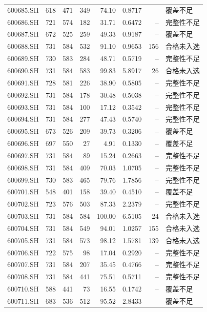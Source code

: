 \documentclass[10pt,a4paper]{article}
\begin{document}
\begin{longtable}{lrrr r r r l}
600685.SH & 618 & 471 & 349 & 74.10 & 0.8717 & -- & 覆盖不足\\
600686.SH & 721 & 574 & 182 & 31.71 & 0.6472 & -- & 完整性不足\\
600687.SH & 672 & 525 & 259 & 49.33 & 0.9187 & -- & 覆盖不足\\
600688.SH & 731 & 584 & 532 & 91.10 & 0.9653 & 156 & 合格未入选\\
600689.SH & 730 & 583 & 284 & 48.71 & 0.5719 & -- & 完整性不足\\
600690.SH & 731 & 584 & 583 & 99.83 & 5.8917 & 26 & 合格未入选\\
600691.SH & 728 & 581 & 226 & 38.90 & 0.5805 & -- & 完整性不足\\
600692.SH & 731 & 584 & 178 & 30.48 & 0.5038 & -- & 完整性不足\\
600693.SH & 731 & 584 & 100 & 17.12 & 0.3542 & -- & 完整性不足\\
600694.SH & 731 & 584 & 277 & 47.43 & 0.5740 & -- & 完整性不足\\
600695.SH & 673 & 526 & 209 & 39.73 & 0.3206 & -- & 覆盖不足\\
600696.SH & 697 & 550 & 27 & 4.91 & 0.1330 & -- & 覆盖不足\\
600697.SH & 731 & 584 & 89 & 15.24 & 0.2663 & -- & 完整性不足\\
600698.SH & 731 & 584 & 409 & 70.03 & 1.0705 & -- & 完整性不足\\
600699.SH & 730 & 583 & 465 & 79.76 & 1.7856 & -- & 完整性不足\\
600701.SH & 548 & 401 & 158 & 39.40 & 0.4510 & -- & 覆盖不足\\
600702.SH & 723 & 576 & 503 & 87.33 & 2.2379 & -- & 完整性不足\\
600703.SH & 731 & 584 & 584 & 100.00 & 6.5105 & 24 & 合格未入选\\
600704.SH & 731 & 584 & 549 & 94.01 & 1.0257 & 155 & 合格未入选\\
600705.SH & 731 & 584 & 573 & 98.12 & 1.5781 & 139 & 合格未入选\\
600706.SH & 722 & 575 & 98 & 17.04 & 0.2920 & -- & 完整性不足\\
600707.SH & 731 & 584 & 207 & 35.45 & 0.4766 & -- & 完整性不足\\
600708.SH & 731 & 584 & 441 & 75.51 & 0.5711 & -- & 完整性不足\\
600710.SH & 588 & 441 & 73 & 16.55 & 0.1742 & -- & 覆盖不足\\
600711.SH & 683 & 536 & 512 & 95.52 & 2.8433 & -- & 覆盖不足\\

\end{longtable}
\end{document}
